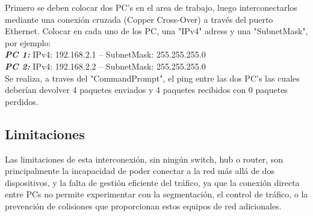 \documentclass[]{article}
\begin{document}
Primero se deben colocar dos PC's en el area de trabajo, luego interconectarlos mediante una conexión cruzada (Copper Cross-Over) a través del puerto Ethernet. Colocar en cada uno de los PC, una "IPv4" adress y una "SubnetMask", por ejemplo: 
\\
\textit{\textbf{PC 1:}} IPv4: 192.168.2.1 -- SubnetMask: 255.255.255.0
\\
\textit{\textbf{PC 2:}} IPv4: 192.168.2.2 -- SubnetMask: 255.255.255.0
\\
Se realiza, a traves del "CommandPrompt", el ping entre las dos PC's las cuales deberían devolver 4 paquetes enviados y 4 paquetes recibidos con 0 paquetes perdidos.

\begin{center}
	{\tiny \section*{Limitaciones}}
\begin{flushleft}
		Las limitaciones de esta interconexión, sin ningún switch, hub o router, son principalmente la incapacidad de poder conectar a la red más allá de dos dispositivos, y la falta de gestión eficiente del tráfico, ya que la conexión directa entre PCs no permite experimentar con la segmentación, el control de tráfico, o la prevención de colisiones que proporcionan estos equipos de red adicionales.
\end{flushleft}	
\end{center}
\end{document}
